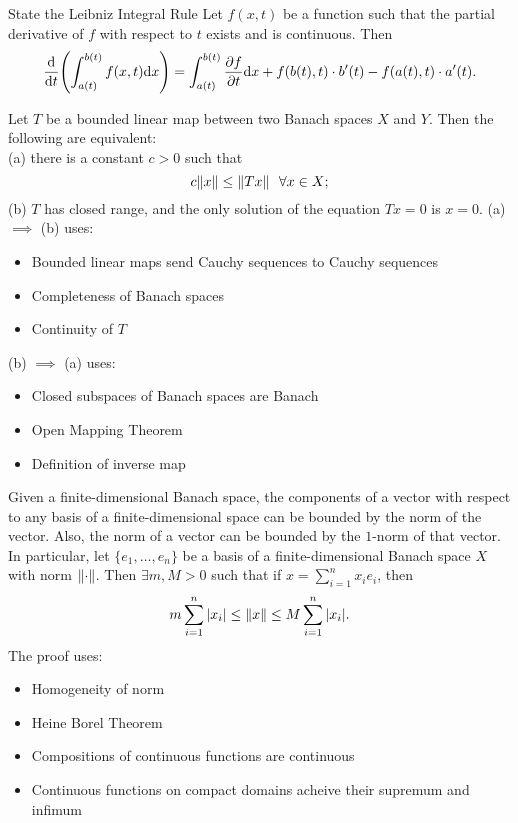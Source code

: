 \documentclass[avery5388,grid,frame]{flashcards}
\begin{document}
\begin{flashcard}
    {State the Leibniz Integral Rule}
    Let $f(x,t)$ be a function such that the partial derivative of $f$ with respect to $t$ exists and is continuous.  Then
    \begin{align*}
        \frac{\dd}{\dd t}\qty(\int_{a(t)}^{b(t)}f(x,t)\dd x) = \int_{a(t)}^{b(t)} \frac{\partial f}{\partial t}\dd x + f(b(t),t)\cdot b'(t) - f(a(t),t)\cdot a'(t).
    \end{align*}
\end{flashcard}

\begin{flashcard}
    {Let $T$ be a bounded linear map between two Banach spaces $X$ and $Y$.  Then the following are equivalent: \\ \hphantom{} (a) there is a constant $c > 0$ such that $$c\norm{x} \leq \norm{Tx}\ \ \forall x \in X;$$ (b) $T$ has closed range, and the only solution of the equation $Tx = 0$ is $x = 0$.}
    (a) $\implies$ (b) uses:
    \begin{itemize}
        \item Bounded linear maps send Cauchy sequences to Cauchy sequences
        \item Completeness of Banach spaces
        \item Continuity of $T$
    \end{itemize}
    (b) $\implies$ (a) uses:
    \begin{itemize}
        \item Closed subspaces of Banach spaces are Banach
        \item Open Mapping Theorem
        \item Definition of inverse map
    \end{itemize}
\end{flashcard}

\begin{flashcard}
    {Given a finite-dimensional Banach space, the components of a vector with respect to any basis of a finite-dimensional space can be bounded by the norm of the vector.  Also, the norm of a vector can be bounded by the $1$-norm of that vector.  In particular, let $\{e_1, \dots, e_n\}$ be a basis of a finite-dimensional Banach space $X$ with norm $\norm{\cdot}$.  Then $\exists m,M > 0$ such that if $x = \sum_{i=1}^n x_ie_i$, then $$m\sum_{i=1}^n \abs{x_i} \leq \norm{x} \leq M\sum_{i=1}^n \abs{x_i}.$$}
    The proof uses:
    \begin{itemize}
        \item Homogeneity of norm
        \item Heine Borel Theorem
        \item Compositions of continuous functions are continuous
        \item Continuous functions on compact domains acheive their supremum and infimum
    \end{itemize}
\end{flashcard}
\end{document}
